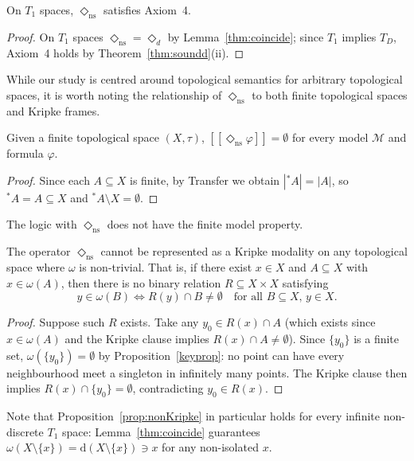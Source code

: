 \documentclass[submission,copyright,creativecommons]{eptcs}
\newcommand{\sem}[1]{[\![#1]\!]}
\newcommand{\diam}{\Diamond}
\newcommand{\str}{{{}^{*}\!}}
\newcommand{\lozengens}{\diam_\mathrm{ns}}
\begin{document}
\begin{corollary}
\label{cor:T1axioms}
On $T_1$ spaces, $\lozengens$ satisfies Axiom~4.
\end{corollary}

\begin{proof}
On $T_1$ spaces $\lozengens = \diam_d$ by Lemma~\ref{thm:coincide};
since $T_1$ implies $T_D$,  Axiom~4 holds by 
Theorem~\ref{thm:soundd}\mbox{(ii).\qedhere}
\end{proof}
While our study is centred around topological semantics for arbitrary topological spaces, it is worth noting the relationship of $\lozengens$ to both finite topological spaces and Kripke frames.
\begin{proposition}
\label{thm:degenerate}
Given a finite topological space $(X,\tau)$,
$\sem{\lozengens\varphi} = \emptyset$ for every model $\mathcal{M}$ and formula $\varphi$.
\end{proposition}

\begin{proof}
Since each $A\subseteq X$ is finite, by Transfer we obtain $|\str A|=|A|$, so $\str A = A \subseteq X$ and $\str A \setminus X=\emptyset$.
\end{proof}
\begin{corollary}
\label{cor:nofmp}
The logic with $\diam_\mathrm{ns}$ does not have the finite model property.
\end{corollary}

\begin{proposition}
\label{prop:nonKripke}
The operator $\diam_\mathrm{ns}$ cannot be represented as a Kripke modality on any topological space where $\omega$ is non-trivial.
That is, if there exist $x \in X$ and $A \subseteq X$ with
$x \in \omega(A)$, then there is no binary relation
$R \subseteq X \times X$ satisfying
\[
  y \in \omega(B) \iff R(y) \cap B \neq \emptyset
  \quad\text{for all }B \subseteq X,\, y \in X.
\]
\end{proposition}

\begin{proof}
Suppose such $R$ exists. Take any $y_0 \in R(x) \cap A$ (which exists since $x \in \omega(A)$ and the Kripke clause implies $R(x)\cap A \neq\emptyset$). 
Since $\{y_0\}$ is a finite set, $\omega(\{y_0\}) = \emptyset$ by Proposition~\ref{keyprop}: no point can have every neighbourhood meet a singleton in infinitely many points. 
The Kripke clause then implies
$R(x) \cap \{y_0\} = \emptyset$, contradicting $y_0 \in R(x)$.
\end{proof}
Note that Proposition~\ref{prop:nonKripke} in particular holds for every infinite non-discrete $T_1$ space:
Lemma~\ref{thm:coincide} guarantees
$\omega(X\setminus\{x\}) = \mathrm{d}(X\setminus\{x\})
\ni x$ for any non-isolated $x$.
\end{document}
